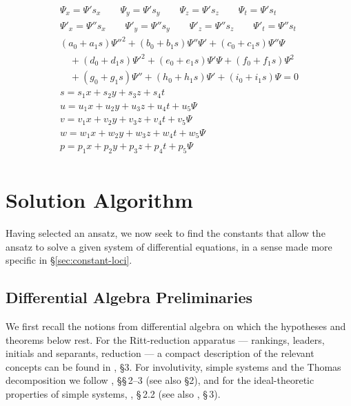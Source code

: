 \documentclass{article}
\theoremstyle{definition}
\theoremstyle{plain}
\begin{document}
\begin{equation}
\label{ansatz 18}
\begin{gathered}
\Psi_x = \Psi' s_x \qquad
\Psi_y = \Psi' s_y \qquad
\Psi_z = \Psi' s_z \qquad
\Psi_t = \Psi' s_t \\
\Psi'_x = \Psi'' s_x \qquad
\Psi'_y = \Psi'' s_y \qquad
\Psi'_z = \Psi'' s_z \qquad
\Psi'_t = \Psi'' s_t \\
(a_0 + a_1 s) \Psi''^2 + (b_0 + b_1 s) \Psi''\Psi' + (c_0 + c_1 s) \Psi''\Psi \\
\quad + (d_0 + d_1 s) \Psi'^2 + (e_0 + e_1 s) \Psi'\Psi + (f_0 + f_1 s) \Psi^2 \\
\quad + (g_0 + g_1 s) \Psi'' + (h_0 + h_1 s) \Psi' + (i_0 + i_1 s) \Psi = 0 \\
s = s_1 x + s_2 y + s_3 z + s_4 t \\
u = u_1 x + u_2 y + u_3 z + u_4 t + u_5 \Psi \\
v = v_1 x + v_2 y + v_3 z + v_4 t + v_5 \Psi \\
w = w_1 x + w_2 y + w_3 z + w_4 t + w_5 \Psi \\
p = p_1 x + p_2 y + p_3 z + p_4 t + p_5 \Psi \\
\end{gathered}
\end{equation}

\section{Solution Algorithm}
\label{sec:Solution Algorithm}

Having selected an ansatz, we now
seek to find the constants that allow the ansatz to solve a given system of differential equations, in a sense
made more specific in \S\ref{sec:constant-loci}.

\subsection{Differential Algebra Preliminaries}
\label{sec:preliminaries}

We first recall the notions from differential algebra on which
the hypotheses and theorems below rest.  For the Ritt-reduction apparatus ---
rankings, leaders, initials and separants, reduction ---
a compact description of the relevant concepts can be found in \cite{blop}, \S 3.
For involutivity, simple systems and
the Thomas decomposition we follow \cite{ThomasDecomp}, \S\S\,2--3 (see also \cite{LHRcontrol} \S2), and for the
ideal-theoretic properties of simple systems, \cite{RobertzLNM}, \S\,2.2 (see also \cite{RobertzCIRM}, \S\,3).
\end{document}
